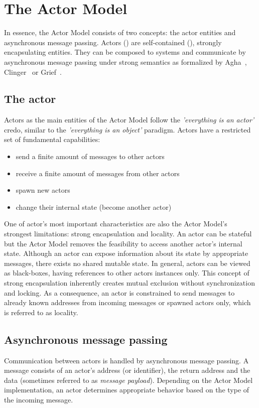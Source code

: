 \documentclass[11pt, journal]{IEEEtran}
\begin{document}
\section{The Actor Model}\label{sec:actor_model}
In essence, the Actor Model consists of two concepts: the actor entities and asynchronous message passing. Actors (\cite{Hewitt:1973:UMA:1624775.1624804}) are self-contained (\cite{Agha:1990:COP:83880.84528}), strongly encapsulating entities. They can be composed to systems and communicate by asynchronous message passing \cite{Agha:1990:COP:83880.84528} under strong semantics as formalized by Agha~\cite{Agha:1990:SSA:648142.749964}, Clinger~\cite{Clinger:1981:FAS:889486} or Grief~\cite{Grief:1975:SCP:888942}.

\subsection{The actor}\label{subsec:actor}
Actors as the main entities of the Actor Model follow the \textit{'everything is an actor'} credo, similar to the \textit{'everything is an object'} paradigm. Actors have a restricted set of fundamental capabilities:

\begin{itemize}
	\item send a finite amount of messages to other actors
	\item receive a finite amount of messages from other actors
	\item spawn new actors
	\item change their internal state (become another actor)
\end{itemize}

One of actor's most important characteristics are also the Actor Model's strongest limitations: strong encapsulation and locality. An actor can be stateful but the Actor Model removes the feasibility to access another actor's internal state. Although an actor can expose information about its state by appropriate messages, there exists no shared mutable state. In general, actors can be viewed as black-boxes, having references to other actors instances only. This concept of strong encapsulation inherently creates mutual exclusion without synchronization and locking. As a consequence, an actor is constrained to send messages to already known addresses from incoming messages or spawned actors only, which is referred to as locality.

\subsection{Asynchronous message passing}\label{subsec:messagepassing}
Communication between actors is handled by asynchronous message passing. A message consists of an actor's address (or identifier), the return address and the data (sometimes referred to as \textit{message payload}). Depending on the Actor Model implementation, an actor determines appropriate behavior based on the type of the incoming message.\\
\end{document}
